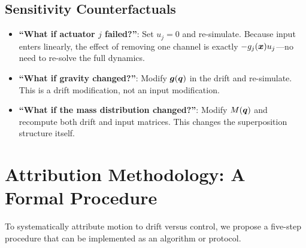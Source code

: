 \subsection{Sensitivity Counterfactuals}

\begin{itemize}
\item \textbf{``What if actuator $j$ failed?''}: Set $u_j=0$ and re-simulate.
      Because input enters linearly, the effect of removing one channel is exactly
      $-g_j(\bm{x})u_j$---no need to re-solve the full dynamics.
\item \textbf{``What if gravity changed?''}: Modify $\bm{g}(\bm{q})$ in the drift and
      re-simulate. This is a drift modification, not an input modification.
\item \textbf{``What if the mass distribution changed?''}: Modify $M(\bm{q})$ and
      recompute both drift and input matrices. This changes the superposition
      structure itself.
\end{itemize}

\section{Attribution Methodology: A Formal Procedure}

To systematically attribute motion to drift versus control, we propose a five-step
procedure that can be implemented as an algorithm or protocol.

